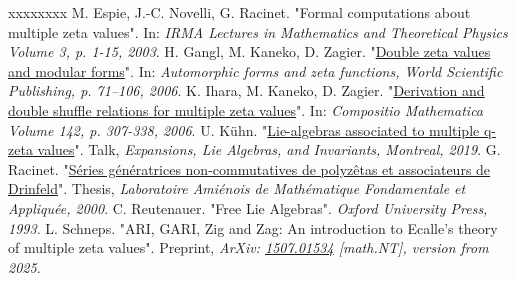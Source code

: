\documentclass[12pt,reqno]{amsart}
\numberwithin{equation}{section}
\theoremstyle{definition}
\begin{document}
\begin{thebibliography}{xxxxxxxx}
 M. Espie, J.-C. Novelli, G. Racinet. "Formal computations about multiple zeta values". In: \textit{IRMA Lectures in Mathematics and Theoretical Physics Volume 3, p. 1-15, 2003}.
 H. Gangl, M. Kaneko, D. Zagier. "\href{https://people.mpim-bonn.mpg.de/zagier/files/mpim/05-96/fulltext.pdf}{Double zeta values and modular forms}". In: \textit{Automorphic forms and zeta functions, World Scientific Publishing, p. 71–106, 2006}.
 K. Ihara,  M. Kaneko, D. Zagier. "\href{https://people.mpim-bonn.mpg.de/zagier/files/doi/10.1112/S0010437X0500182X/fulltext.pdf}{Derivation and double shuffle relations for multiple zeta values}". In: \textit{Compositio Mathematica Volume 142, p. 307-338, 2006}.
 U. Kühn. "\href{https://www.math.utoronto.ca/~drorbn/Talks/CRM-1907/Kuehn_montreal_2019.pdf}{Lie-algebras associated to multiple q-zeta values}". Talk, \textit{Expansions, Lie Algebras, and Invariants, Montreal, 2019}.
 G. Racinet. "\href{https://tel.archives-ouvertes.fr/tel-00110891}{Séries génératrices non-commutatives de polyzêtas et associateurs de Drinfeld}". Thesis, \textit{Laboratoire Amiénois de Mathématique Fondamentale et Appliquée, 2000}.
 C. Reutenauer. "Free Lie Algebras". \textit{Oxford University Press, 1993}.
 L. Schneps. "ARI, GARI, Zig and Zag: An introduction to Ecalle's theory of multiple zeta values". Preprint, \textit{ArXiv: \href{https://arxiv.org/abs/1507.01534}{1507.01534} [math.NT], version from 2025}.
\end{thebibliography}
\end{document}
